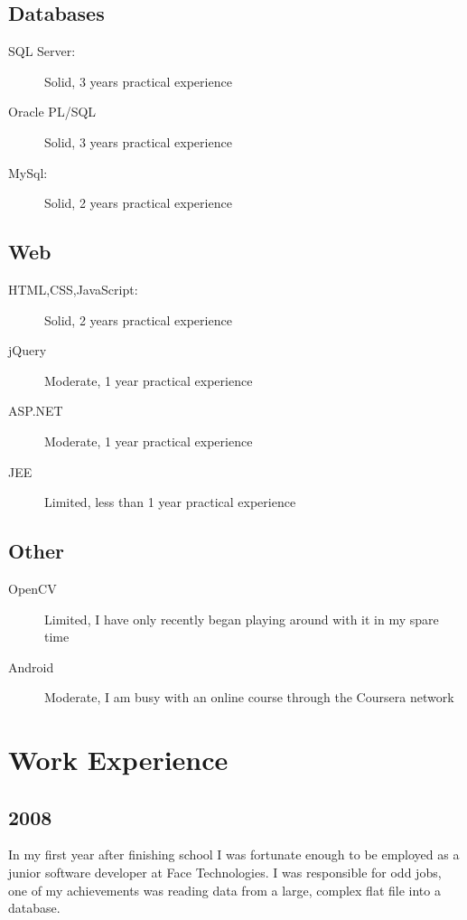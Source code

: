 	\subsection*{Databases}
		\begin{description}
			\item[SQL Server:]Solid, 3 years practical experience
			\item[Oracle PL/SQL]Solid, 3 years practical experience
			\item[MySql:]Solid, 2 years practical experience
		\end{description}
	\subsection*{Web}
		\begin{description}
			\item[HTML,CSS,JavaScript:]Solid, 2 years practical experience
			\item[jQuery]Moderate, 1 year practical experience
			\item[ASP.NET]Moderate, 1 year practical experience
			\item[JEE]Limited, less than 1 year practical experience
		\end{description}
	\subsection*{Other}
		\begin{description}
			\item[OpenCV]Limited, I have only recently began playing around with it in my spare time
			\item[Android]Moderate, I am busy with an online course through the Coursera network
		\end{description}
	


\section*{Work Experience}

	\subsection*{2008}
		In my first year after finishing school I was fortunate enough to be employed as a junior software developer at Face Technologies. 
		I was responsible for odd jobs, one of my achievements was reading data from a large, complex flat file into a database.
